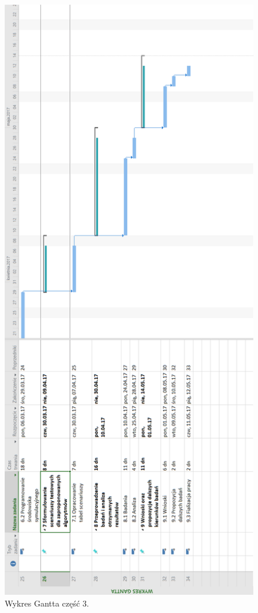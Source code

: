 \documentclass[12pt]{article} %
\begin{document}
\begin{figure}[H]
  \centering
  \includegraphics[scale=0.5]{images/g3.png}
  \caption{Wykres Gantta część 3.}
\end{figure}
\end{document}
